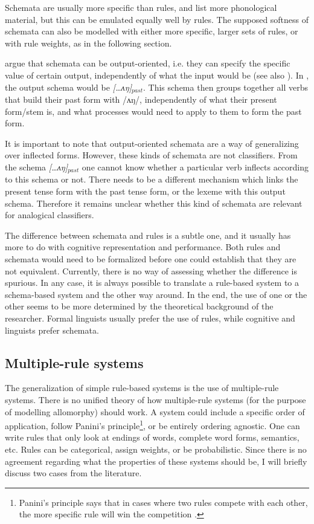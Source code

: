 Schemata are usually more specific than rules, and list more phonological material, but this can be emulated equally well by rules. The supposed softness of schemata can also be modelled with either more specific, larger sets of rules, or with rule weights, as in the following section.

\textcite[chapter 11.2--11.3]{Croft.2004} argue that schemata can be output-oriented, i.e. they can specify the specific value of certain output, independently of what the input would be (see also \citealt{Bybee.1995}). In , the output schema would be \textit{[\dots ʌŋ]$_{past}$}. This schema then groups together all verbs that build their past form with /ʌŋ/, independently of what their present form/stem is, and what processes would need to apply to them to form the past form.

It is important to note that output-oriented schemata are a way of generalizing over inflected forms. However, these kinds of schemata are not classifiers. From the schema \textit{[\dots ʌŋ]$_{past}$} one cannot know whether a particular verb inflects according to this schema or not. There needs to be a different mechanism which links the present tense form with the past tense form, or the lexeme with this output schema. Therefore it remains unclear whether this kind of schemata are relevant for analogical classifiers.

The difference between schemata and rules is a subtle one, and it usually has more to do with cognitive representation and performance. Both rules and schemata would need to be formalized before one could establish that they are not equivalent. Currently, there is no way of assessing whether the difference is spurious. In any case, it is always possible to translate a rule-based system to a schema-based system and the other way around. In the end, the use of one or the other seems to be more determined by the theoretical background of the researcher. Formal linguists usually prefer the use of rules, while cognitive and  linguists prefer schemata.


\subsection{Multiple-rule systems}


The generalization of simple rule-based systems is the use of multiple-rule systems. There is no unified theory of how multiple-rule systems (for the purpose of modelling allomorphy) should work. A system could include a specific order of application, follow Panini's principle\footnote{Panini's principle says that in cases where two rules compete with each other, the more specific rule will win the competition \autocite{Zwicky.1986}.}, or be entirely ordering agnostic. One can write rules that only look at endings of words, complete word forms, semantics, etc. Rules can be categorical, assign weights, or be probabilistic.  Since there is no agreement regarding what the properties of these systems should be, I will briefly discuss two cases from the literature.

